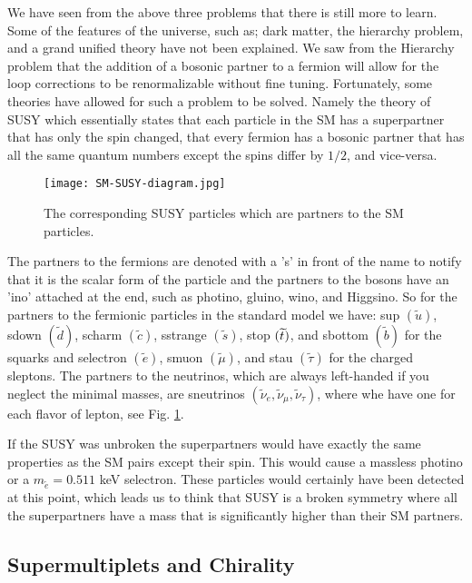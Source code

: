 We have seen from the above three problems that there is still more to learn. Some of the features of the universe, such as; dark matter, the hierarchy problem, and a grand unified theory have not been explained. We saw from the Hierarchy problem that the addition of a bosonic partner to a fermion will allow for the loop corrections to be renormalizable without fine tuning. Fortunately, some theories have allowed for such a problem to be solved. Namely the theory of SUSY which essentially states that each particle in the SM has a superpartner that has only the spin changed, that every fermion has a bosonic partner that has all the same quantum numbers except the spins differ by $1/2$, and vice-versa.

\begin{figure}
 	\centering
	\texttt{[image: SM-SUSY-diagram.jpg]}
 	\caption[Supersymmetry and Standard Model Particles]{The corresponding SUSY particles which are partners to the SM particles.}
 	\label{SUSYParticles} 
\end{figure}

The partners to the fermions are denoted with a 's' in front of the name to notify that it is the scalar form of the particle and the partners to the bosons have an 'ino' attached at the end, such as photino, gluino, wino, and Higgsino. So for the partners to the fermionic particles in the standard model we have: sup $(\widetilde{u})$, sdown $(\widetilde{d})$, scharm $(\widetilde{c})$, sstrange $(\widetilde{s})$, stop $(\widetilde{t})$, and sbottom $(\widetilde{b})$ for the squarks and selectron $(\widetilde{e})$, smuon $(\widetilde{\mu})$, and stau $(\widetilde{\tau})$ for the charged sleptons. The partners to the neutrinos, which are always left-handed if you neglect the minimal masses, are sneutrinos $(\widetilde{\nu}_e, \widetilde{\nu}_\mu, \widetilde{\nu}_\tau)$, where whe have one for each flavor of lepton, see Fig. \ref{SUSYParticles}. 

If the SUSY was unbroken the superpartners would have exactly the same properties as the SM pairs except their spin. This would cause a massless photino or a $m_{\widetilde{e}}=0.511$ keV selectron. These particles would certainly have been detected at this point, which leads us to think that SUSY is a broken symmetry where all the superpartners have a mass that is significantly higher than their SM partners. 

\subsection{Supermultiplets and Chirality}
\label{subsec:chiral}

